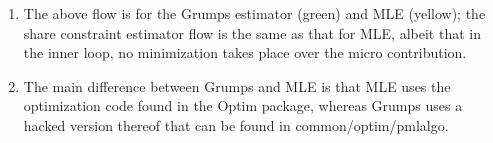 \documentclass[12pt]{article}
\begin{document}
{\LARGE
\begin{enumerate}
    \item The above flow is for the Grumps estimator (green) and MLE (yellow); the share constraint estimator flow is the same as that for MLE, albeit that in the inner loop, no minimization takes place over the micro contribution.
    \item The main difference between Grumps and MLE is that MLE uses the optimization code found in the Optim package, whereas Grumps uses a hacked version thereof that can be found in common/optim/pmlalgo.
\end{enumerate}
}
\end{document}
